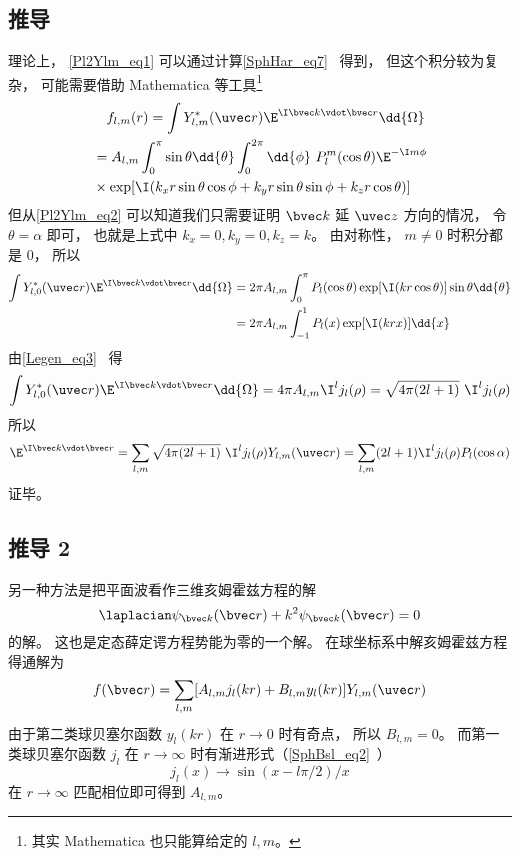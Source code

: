 \subsection{推导}
理论上， \autoref{Pl2Ylm_eq1} 可以通过计算\autoref{SphHar_eq7}~ 得到， 但这个积分较为复杂， 可能需要借助 Mathematica 等工具\footnote{其实 Mathematica 也只能算给定的 $l, m$。}
\begin{equation}
\begin{aligned}
&\quad f_{l,m}(r) = \int Y_{l,m}^*(\uvec r)\E^{\I \bvec k \vdot \bvec r} \dd{\Omega}\\
&= A_{l,m}\int_0^\pi \sin\theta\dd{\theta} \int_0^{2\pi} \dd{\phi} \,\,P_l^m(\cos\theta) \E^{-\I m \phi}\\
&\times \exp[\I (k_x r \sin\theta\cos\phi + k_y r \sin\theta\sin\phi + k_z r \cos\theta)]
\end{aligned}
\end{equation}
但从\autoref{Pl2Ylm_eq2} 可以知道我们只需要证明 $\bvec k$ 延 $\uvec z$ 方向的情况， 令 $\theta = \alpha$ 即可， 也就是上式中 $k_x = 0, k_y = 0, k_z = k$。 由对称性， $m \ne 0$ 时积分都是 0， 所以
\begin{equation}
\begin{aligned}
\int Y_{l,0}^*(\uvec r)\E^{\I \bvec k \vdot \bvec r} \dd{\Omega}
&= 2\pi A_{l,m}\int_0^\pi P_l(\cos\theta) \exp[\I (k r \cos\theta)] \sin\theta\dd{\theta}\\
&= 2\pi A_{l,m}\int_{-1}^1 P_l(x) \exp[\I (k r x)] \dd{x}
\end{aligned}
\end{equation}
由\autoref{Legen_eq3}~ 得
\begin{equation}
\int Y_{l,0}^*(\uvec r)\E^{\I \bvec k \vdot \bvec r} \dd{\Omega}
= 4\pi A_{l,m} \I^l j_l(\rho)
= \sqrt{4\pi (2l + 1)}\ \I^l j_l(\rho)
\end{equation}
所以
\begin{equation}
\E^{\I \bvec k \vdot \bvec r} = \sum_{l,m} \sqrt{4\pi (2l + 1)}\ \I^l j_l(\rho) Y_{l,m}(\uvec r)
=\sum_{l,m} (2l + 1) \I^l j_l(\rho) P_l(\cos\alpha)
\end{equation}
证毕。

\subsection{推导 2}
另一种方法是把平面波看作三维亥姆霍兹方程的解
\begin{equation}
\laplacian \psi_{\bvec k}(\bvec r) + k^2 \psi_{\bvec k}(\bvec r) = 0
\end{equation}
的解。 这也是定态薛定谔方程势能为零的一个解。 在球坐标系中解亥姆霍兹方程 得通解为
\begin{equation}
f(\bvec r) = \sum_{l,m} [A_{l,m} j_l(kr) + B_{l,m} y_l(kr)] Y_{l,m}(\uvec r)
\end{equation}
由于第二类球贝塞尔函数 $y_l(kr)$ 在 $r\to 0$ 时有奇点， 所以 $B_{l,m} = 0$。 而第一类球贝塞尔函数 $j_l$ 在 $r\to \infty$ 时有渐进形式（\autoref{SphBsl_eq2}~）
\begin{equation}
j_l(x) \to \sin(x - l\pi /2)/x
\end{equation}
在 $r\to \infty$ 匹配相位即可得到 $A_{l,m}$。
